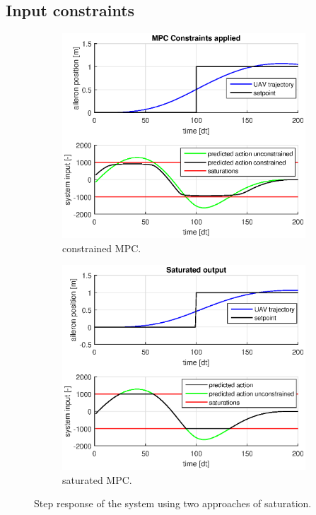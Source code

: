 \documentclass[a4paper,11pt,titlepage]{article}
\begin{document}
\subsection{Input constraints}
\label{sec:input_constraints}
\begin{figure}[h]
\centering
\begin{subfigure}[b]{0.55\textwidth}
	\includegraphics[width=\textwidth]{fig/step_constrained_2.eps}
	\caption{constrained MPC.}
	\label{fig:mpc_constrained}
\end{subfigure}%
\begin{subfigure}[b]{0.55\textwidth}
	\includegraphics[width=\textwidth]{fig/step_saturated_2.eps}
	\caption{saturated MPC.}
	\label{fig:mpc_saturated}
\end{subfigure}
\caption{Step response of the system using two approaches of saturation.}
\end{figure}
\end{document}
